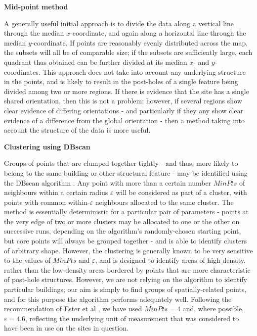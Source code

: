 \documentclass[../../ArchStats.tex]{subfiles}
\begin{document}
\textbf{Mid-point method}

A generally useful initial approach is to divide the data along a vertical line through the median $x$-coordinate, and again along a horizontal line through the median $y$-coordinate. If points are reasonably evenly distributed across the map, the subsets will all be of comparable size; if the subsets are sufficiently large, each quadrant  thus obtained can be further divided at its median $x$- and $y$-coordinates. This approach does not take into account any underlying structure in the points, and is likely to result in the post-holes of a single feature being divided among two or more regions. If there is evidence that the site has a single shared orientation, then this is not a problem; however, if several regions show clear evidence of differing orientations - and particularly if they any show clear evidence of a difference from the global orientation - then a method taking into account the structure of the data is more useful.

\textbf{Clustering using DBscan}

Groups of points that are clumped together tightly - and thus, more likely to belong to the same building or other structural feature - may be identified using the DBscan algorithm \cite{Ester1996}. Any point with more than a certain number $MinPts$ of neighbours within a certain radius $\varepsilon$ will be considered as part of a cluster, with points with common within-$\varepsilon$ neighbours allocated to the same cluster. The method is essentially deterministic for a particular pair of parameters - points at the very edge of two or more clusters may be allocated to one or the other on successive runs, depending on the algorithm's randomly-chosen starting point, but core points will always be grouped together - and is able to identify clusters of arbitrary shape. However, the clustering is generally known to be very sensitive to the values of $MinPts$ and $\varepsilon$, and is designed to identify areas of high density, rather than the low-density areas bordered by points that are more characteristic of post-hole structures. However, we are not relying on the algorithm to identify particular buildings; our aim is simply to find  groups of spatially-related points, and for this purpose the algorithm performs adequately well. Following the recommendation of Ester et al \cite{Ester1996}, we have used $MinPts = 4$ and, where possible, $\varepsilon = 4.6$, reflecting the underlying unit of measurement that was considered to have been in use on the sites in question.
\end{document}
